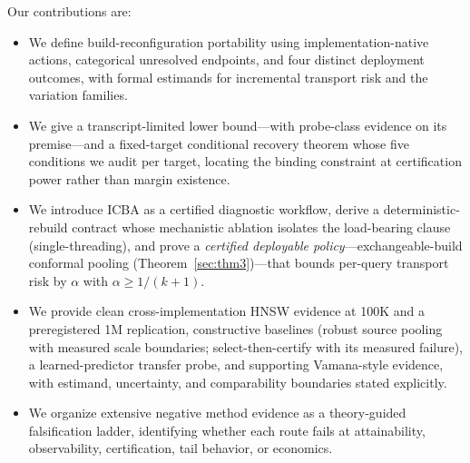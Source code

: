\documentclass{article}
\begin{document}
Our contributions are:
\begin{itemize}\itemsep1pt
\item We define build-reconfiguration portability using implementation-native actions, categorical
unresolved endpoints, and four distinct deployment outcomes, with formal estimands for incremental
transport risk and the variation families.
\item We give a transcript-limited lower bound---with probe-class evidence on its premise---and a
fixed-target conditional recovery theorem whose five conditions we audit per target, locating the binding
constraint at certification power rather than margin existence.
\item We introduce ICBA as a certified diagnostic workflow, derive a deterministic-rebuild contract whose
mechanistic ablation isolates the load-bearing clause (single-threading), and prove a
\emph{certified deployable policy}---exchangeable-build conformal pooling
(Theorem~\ref{sec:thm3})---that bounds per-query transport risk by $\alpha$ with
$\alpha\ge 1/(k{+}1)$.
\item We provide clean cross-implementation HNSW evidence at 100K and a preregistered 1M replication,
constructive baselines (robust source pooling with measured scale boundaries; select-then-certify with its
measured failure), a learned-predictor transfer probe, and supporting Vamana-style evidence, with estimand,
uncertainty, and comparability boundaries stated explicitly.
\item We organize extensive negative method evidence as a theory-guided falsification ladder, identifying
whether each route fails at attainability, observability, certification, tail behavior, or economics.
\end{itemize}
\end{document}
